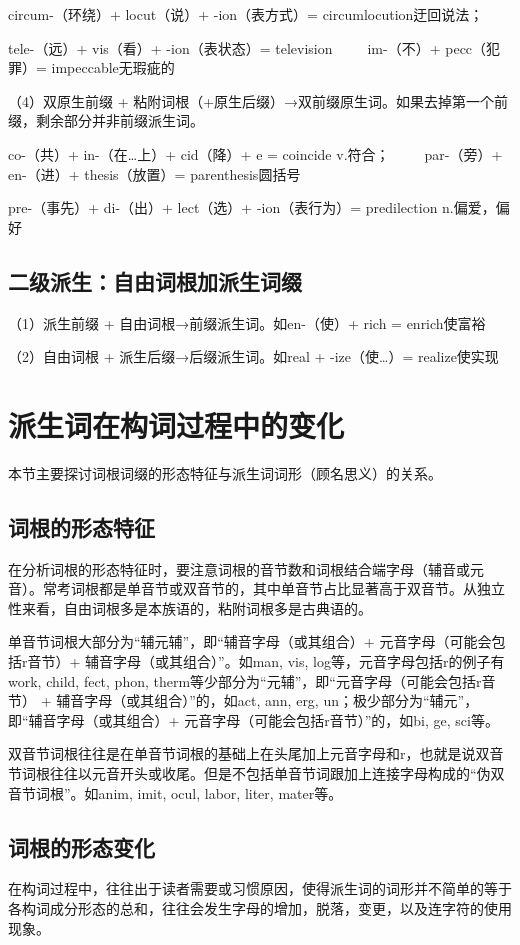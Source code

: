 circum-（环绕）+ locut（说）+ -ion（表方式）= circumlocution迂回说法；

tele-（远）+ vis（看）+ -ion（表状态）= television~~~~~im-（不）+ pecc（犯罪）= impeccable无瑕疵的

（4）双原生前缀 + 粘附词根（+原生后缀）→双前缀原生词。如果去掉第一个前缀，剩余部分并非前缀派生词。

co-（共）+ in-（在…上）+ cid（降）+ e = coincide v.符合；~~~~~par-（旁）+ en-（进）+ thesis（放置）= parenthesis圆括号

pre-（事先）+ di-（出）+ lect（选）+ -ion（表行为）= predilection n.偏爱，偏好

\subsection{二级派生：自由词根加派生词缀}
（1）派生前缀 + 自由词根→前缀派生词。如en-（使）+ rich = enrich使富裕

（2）自由词根 + 派生后缀→后缀派生词。如real + -ize（使…）= realize使实现

\section{派生词在构词过程中的变化}
本节主要探讨词根词缀的形态特征与派生词词形（顾名思义）的关系。
\subsection{词根的形态特征}
在分析词根的形态特征时，要注意词根的音节数和词根结合端字母（辅音或元音）。常考词根都是单音节或双音节的，其中单音节占比显著高于双音节。从独立性来看，自由词根多是本族语的，粘附词根多是古典语的。

单音节词根大部分为“辅元辅”，即“辅音字母（或其组合）+ 元音字母（可能会包括r音节）+ 辅音字母（或其组合）”。如man, vis, log等，元音字母包括r的例子有work, child, fect, phon, therm等少部分为“元辅”，即“元音字母（可能会包括r音节） + 辅音字母（或其组合）”的，如act, ann, erg, un；极少部分为“辅元”，即“辅音字母（或其组合）+ 元音字母（可能会包括r音节）”的，如bi, ge, sci等。

双音节词根往往是在单音节词根的基础上在头尾加上元音字母和r，也就是说双音节词根往往以元音开头或收尾。但是不包括单音节词跟加上连接字母构成的“伪双音节词根”。如anim, imit, ocul, labor, liter, mater等。
\subsection{词根的形态变化}
在构词过程中，往往出于读者需要或习惯原因，使得派生词的词形并不简单的等于各构词成分形态的总和，往往会发生字母的增加，脱落，变更，以及连字符的使用现象。

